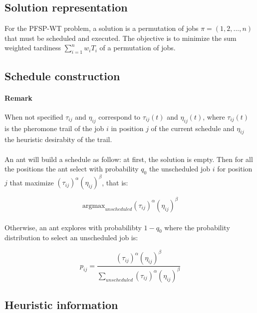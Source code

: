 \documentclass[runningheads]{llncs}
\begin{document}
\subsection{Solution representation} For the PFSP-WT problem, a solution is a permutation of jobs $\pi = (1, 2, ..., n)$
that must be scheduled and executed.
The objective is to minimize the sum weighted tardiness
$\sum_{i=1}^{n}{w_i T_i}$ of a permutation of jobs.




\subsection{Schedule construction}
\paragraph{Remark}

When not specified $\tau_{ij}$ and $\eta_{ij}$ correspond to $\tau_{ij}(t)$ and $\eta_{ij}(t)$,
where $\tau_{ij}(t)$ is the pheromone trail of the job $i$ in position $j$ of the current schedule and $\eta_{ij}$ the heuristic desirabity of the trail.

\paragraph{}

An ant will build a schedule as follow: at first, the solution is empty. Then for all the positions the ant select with probability $q_0$ the unscheduled job $i$ for position $j$ that maximize $(\tau_{ij})^\alpha (\eta_{ij})^\beta$, that is:

\begin{equation}
\mathrm{argmax}_{unscheduled}(\tau_{ij})^\alpha (\eta_{ij})^\beta
\end{equation}

\paragraph{}

Otherwise, an ant explores with probabilibty $1 - q_0$ where the probability distribution to select an unscheduled job is:

\begin{equation}
p_{ij} = \frac{(\tau_{ij})^\alpha (\eta_{ij})^\beta}{\sum_{unscheduled}{(\tau_{ij})^\alpha (\eta_{ij})^\beta}}
\end{equation}

\subsection{Heuristic information}
\end{document}
